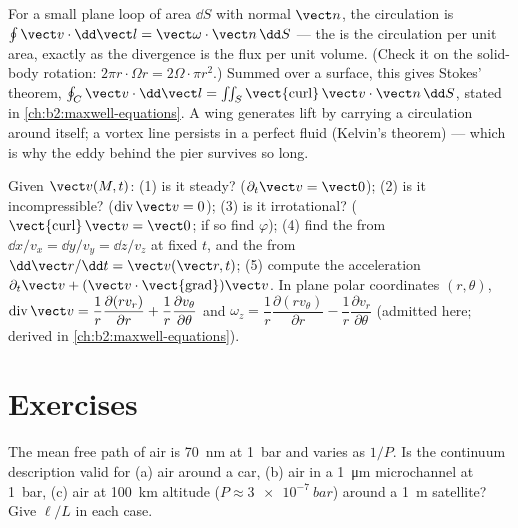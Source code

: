\begin{remark}\label{rem:b2:fluid-kinematics:stokes}
For a small plane loop of area $\dd S$ with normal $\vect n$, the
circulation is $\oint\vect v\cdot\dd\vect l = \vect\omega\cdot\vect n\,\dd S$ ---
the  is the circulation per unit area, exactly as the
divergence is the flux per unit volume. (Check it on the solid-body
rotation: $2\pi r\cdot\Omega r = 2\Omega\cdot\pi r^2$.) Summed over a surface,
this gives Stokes' theorem, $\oint_C\vect v\cdot\dd\vect l = \iint_S
\operatorname{\vect{curl}}\vect v\cdot\vect n\,\dd S$, stated in
\cref{ch:b2:maxwell-equations}. A wing generates lift by carrying a
circulation around itself; a vortex line persists in a perfect fluid
(Kelvin's theorem) --- which is why the eddy behind the pier survives
so long.
\end{remark}

\begin{method}\label{met:b2:fluid-kinematics:reading}
Given $\vect v(M, t)$: (1) is it steady? ($\partial_t\vect v = \vect 0$); (2)
is it incompressible? ($\operatorname{div}\vect v = 0$); (3) is it
irrotational? ($\operatorname{\vect{curl}}\vect v = \vect 0$; if so find
$\varphi$); (4) find the  from $\dd x/v_x = \dd y/v_y = \dd z/
v_z$ at fixed $t$, and the  from $\dd\vect r/\dd t = \vect v(\vect r,
t)$; (5) compute the acceleration $\partial_t\vect v + (\vect v\cdot
\operatorname{\vect{grad}})\vect v$. In plane polar coordinates $(r, \theta)$,
$\operatorname{div}\vect v = \dfrac1r\dfrac{\partial(rv_r)}{\partial r} + \dfrac1r
\dfrac{\partial v_\theta}{\partial\theta}$ and $\omega_z = \dfrac1r\dfrac{\partial(rv_\theta)}
{\partial r} - \dfrac1r\dfrac{\partial v_r}{\partial\theta}$ (admitted here; derived
in \cref{ch:b2:maxwell-equations}).
\end{method}

\section{Exercises}

\begin{exercise}[$\star$]\label{exo:b2:fluid-kinematics:1}
The mean free path of air is \qty{70}{nm} at \qty{1}{bar} and varies as
$1/P$. Is the continuum description valid for (a) air around a car,
(b) air in a \qty{1}{\micro m} microchannel at \qty{1}{bar}, (c) air at
\qty{100}{km} altitude ($P \approx \qty{3e-7}{bar}$) around a \qty{1}{m}
satellite? Give $\ell/L$ in each case.
\end{exercise}

